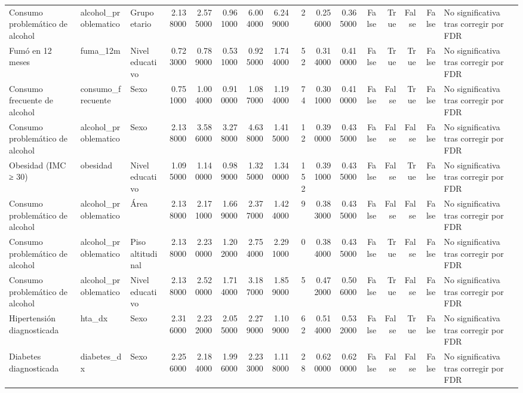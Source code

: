 \begin{table}[htbp]
\begin{tabular}{lllrrrrrrrrrrrrl}
Consumo problemático de alcohol & alcohol\_problematico & Grupo etario & 2.138000 & 2.575000 & 0.961000 & 6.004000 & 6.249000 & 2 & 0.256000 & 0.365000 & False & True & False & False & No significativa tras corregir por FDR \\
Fumó en 12 meses & fuma\_12m & Nivel educativo & 0.723000 & 0.789000 & 0.531000 & 0.925000 & 1.744000 & 52 & 0.314000 & 0.410000 & False & True & True & False & No significativa tras corregir por FDR \\
Consumo frecuente de alcohol & consumo\_frecuente & Sexo & 0.751000 & 1.004000 & 0.910000 & 1.087000 & 1.194000 & 74 & 0.301000 & 0.410000 & False & False & True & False & No significativa tras corregir por FDR \\
Consumo problemático de alcohol & alcohol\_problematico & Sexo & 2.138000 & 3.586000 & 3.278000 & 4.638000 & 1.415000 & 12 & 0.390000 & 0.435000 & False & False & False & False & No significativa tras corregir por FDR \\
Obesidad (IMC ≥ 30) & obesidad & Nivel educativo & 1.095000 & 1.140000 & 0.989000 & 1.325000 & 1.340000 & 152 & 0.391000 & 0.435000 & False & False & True & False & No significativa tras corregir por FDR \\
Consumo problemático de alcohol & alcohol\_problematico & Área & 2.138000 & 2.171000 & 1.669000 & 2.377000 & 1.424000 & 9 & 0.383000 & 0.435000 & False & False & False & False & No significativa tras corregir por FDR \\
Consumo problemático de alcohol & alcohol\_problematico & Piso altitudinal & 2.138000 & 2.230000 & 1.202000 & 2.754000 & 2.291000 & 0 & 0.384000 & 0.435000 & False & True & False & False & No significativa tras corregir por FDR \\
Consumo problemático de alcohol & alcohol\_problematico & Nivel educativo & 2.138000 & 2.520000 & 1.714000 & 3.187000 & 1.859000 & 5 & 0.472000 & 0.506000 & False & True & False & False & No significativa tras corregir por FDR \\
Hipertensión diagnosticada & hta\_dx & Sexo & 2.316000 & 2.232000 & 2.055000 & 2.279000 & 1.109000 & 62 & 0.514000 & 0.532000 & False & False & True & False & No significativa tras corregir por FDR \\
Diabetes diagnosticada & diabetes\_dx & Sexo & 2.256000 & 2.184000 & 1.996000 & 2.233000 & 1.118000 & 28 & 0.620000 & 0.620000 & False & False & False & False & No significativa tras corregir por FDR \\
\bottomrule
\end{tabular}
\end{table}
